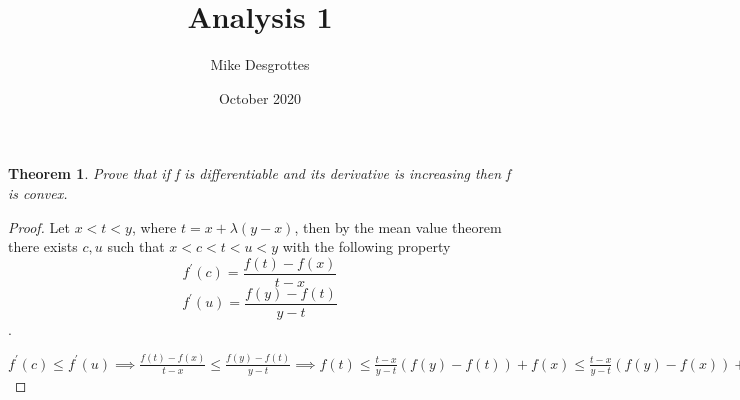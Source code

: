 \documentclass{article}
\title{Analysis 1}
\author{Mike Desgrottes}
\date{October 2020}
\theoremstyle{plain}
\newtheorem{theorem}{Theorem}
\theoremstyle{definition}
\begin{document}
\maketitle

\begin{theorem}
	Prove that if f is differentiable and its derivative is increasing then f is convex.
\end{theorem}

\begin{proof}
	Let $x < t < y$, where $t = x + \lambda(y - x)$, then by the mean value theorem there exists $c,u$ such that $x < c < t < u < y$ with the following property $$f^{'}(c) = \frac{f(t) - f(x)}{t - x} $$  $$f^{'}(u) = \frac{f(y) - f(t)}{y - t} $$. 

	$f^{'}(c) \leq f^{'}(u) \implies \frac{f(t) - f(x)}{t - x} \leq \frac{f(y) - f(t)}{y - t} \implies f(t) \leq \frac{t - x}{y - t}(f(y) - f(t)) + f(x) \leq \frac{t - x}{y - t}(f(y) - f(x)) + f(x)$
\end{proof}
\end{document}
